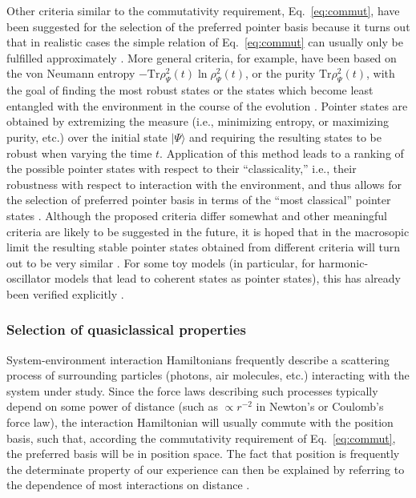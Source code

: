 \documentclass[rmp,aps,amsmath,amsfonts,noshowkeys,noshowpacs,12pt]{revtex4}
\newcommand{\ket}[1]{\ensuremath{|{#1\rangle}}}
\begin{document}
Other criteria similar to the commutativity requirement,
Eq.~\eqref{eq:commut}, have been suggested for the selection of the
preferred pointer basis because it turns out that in realistic cases
the simple relation of Eq.~\eqref{eq:commut} can usually only be
fulfilled approximately \citep{Zurek:1993:qq,Zurek:1993:pu}. More
general criteria, for example, have been based on the von Neumann
entropy $-\text{Tr} \rho^2_\Psi(t) \ln \rho^2_\Psi(t)$, or the purity
$\text{Tr}\rho^2_\Psi(t)$, with the goal of finding the most robust
states or the states which become least entangled with the environment
in the course of the evolution
\citep{Zurek:1993:qq,Zurek:1993:pu,Zurek:1998:re,Zurek:2002:ii}.
Pointer states are obtained by extremizing the measure (i.e.,
minimizing entropy, or maximizing purity, etc.) over the initial state
$\ket{\Psi}$ and requiring the resulting states to be robust when
varying the time $t$.  Application of this method leads to a ranking
of the possible pointer states with respect to their ``classicality,''
i.e., their robustness with respect to interaction with the
environment, and thus allows for the selection of preferred pointer
basis in terms of the ``most classical'' pointer states \citep[the
``predictability sieve''; see][]{Zurek:1993:pu,Zurek:1993:qq}.
Although the proposed criteria differ somewhat and other meaningful
criteria are likely to be suggested in the future, it is hoped that in
the macrosopic limit the resulting stable pointer states obtained from
different criteria will turn out to be very similar
\citep{Zurek:2002:ii}. For some toy models (in particular, for
harmonic-oscillator models that lead to coherent states as pointer
states), this has already been verified explicitly \citep[see, for
example,][]{Kubler:1973:ux,Zurek:1993:pu,Diosi:2000:yn,Joos:2003:jh,Eisert:2003:ib}.


\subsubsection{Selection of quasiclassical properties}

System-environment interaction Hamiltonians frequently describe a
scattering process of surrounding particles (photons, air molecules,
etc.) interacting with the system under study. Since the force laws
describing such processes typically depend on some power of distance
(such as $\propto r^{-2}$ in Newton's or Coulomb's force law), the
interaction Hamiltonian will usually commute with the position basis,
such that, according the commutativity requirement of
Eq.~\eqref{eq:commut}, the preferred basis will be in position space.
The fact that position is frequently the determinate property of our
experience can then be explained by referring to the dependence of
most interactions on distance
\citep{Zurek:1981:dd,Zurek:1982:tv,Zurek:1991:vv}.
\end{document}
